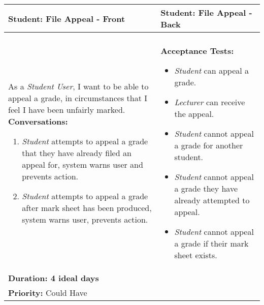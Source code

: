 \documentclass[11pt]{article}
\begin{document}
\begin{center}
\begin{tabular}{ | m{8cm}  |  m{8cm}  | } 
 \hline
 \textbf{Student: File Appeal - Front} &  \textbf{Student: File Appeal - Back}  \\ 
  \hline
&\\[5pt]
As a \emph{Student User}, I want to be able to appeal a grade, in circumstances that I feel I have been unfairly marked.  
\newline
\textbf{Conversations:}
\begin{enumerate}
\item{\emph{Student} attempts to appeal a grade that they have already filed an appeal for, system warns user and prevents action.}
\item{\emph{Student} attempts to appeal a grade after mark sheet has been produced, system warns user, prevents action.}
\end{enumerate}
& \textbf{Acceptance Tests:} 
\begin{itemize}
\item{\emph{Student} can appeal a grade.}
\item{\emph{Lecturer} can receive the appeal.}
\item{\emph{Student} cannot appeal a grade for another student.}
\item{\emph{Student} cannot appeal a grade they have already attempted to appeal.}
\item{\emph{Student} cannot appeal a grade if their mark sheet exists.}
\end{itemize} \\
\textbf{Duration: 4 ideal days} &\\
\textbf{Priority:}  \textcolor{dkgreen}{Could Have} & \\
 \hline
\end{tabular}
\end{center}
\end{document}
